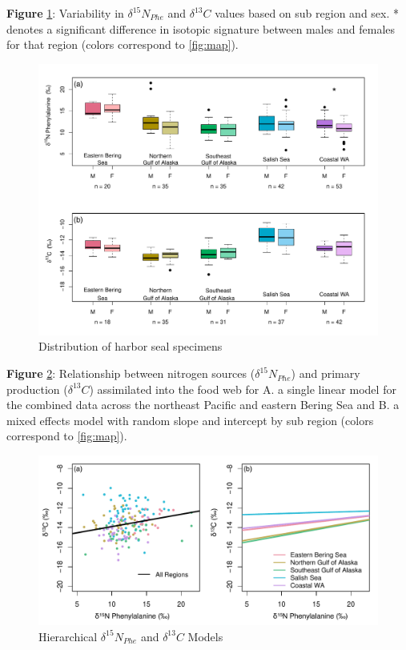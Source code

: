 \documentclass [11pt, proquest] {uwthesis}[2015/03/03]
\begin{document}
\textbf{Figure} \ref{fig:dist}: Variability in \(\delta^{15}N_{Phe}\)
and \(\delta^{13}C\) values based on sub region and sex. * denotes a
significant difference in isotopic signature between males and females
for that region (colors correspond to \ref{fig:map}). \newline 
\begin{figure}[h]
\centering
  \includegraphics[width=1\textwidth]{figure/Ch2/Figure3_SexLocation.pdf}
  \caption{Distribution of harbor seal specimens}
  \label{fig:dist}
\end{figure}
\clearpage

\textbf{Figure} \ref{fig:hiermod}: Relationship between nitrogen sources
(\(\delta^{15}N_{Phe}\)) and primary production (\(\delta^{13}C\))
assimilated into the food web for A. a single linear model for the
combined data across the northeast Pacific and eastern Bering Sea and B.
a mixed effects model with random slope and intercept by sub region
(colors correspond to \ref{fig:map}). \newline 
\begin{figure}[h]
\centering
  \includegraphics[width=1\textwidth]{figure/Ch2/hiermod.pdf}
  \caption{Hierarchical $\delta^{15}N_{Phe}$ and $\delta^{13}C$ Models}
  \label{fig:hiermod}
\end{figure}
\clearpage
\end{document}
